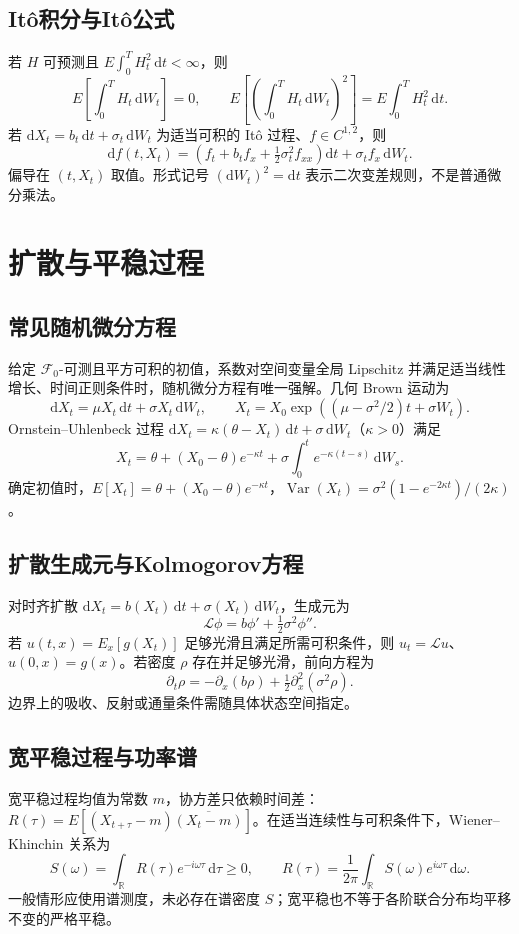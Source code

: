 \documentclass[../main.tex]{subfiles}
\begin{document}
\subsection{Itô积分与Itô公式}
若 $H$ 可预测且 $E\int_0^TH_t^2\,\mathrm dt<\infty$，则
\[
E\!\left[\int_0^TH_t\,\mathrm dW_t\right]=0,\qquad
E\!\left[\left(\int_0^TH_t\,\mathrm dW_t\right)^2\right]
=E\int_0^TH_t^2\,\mathrm dt.
\]
若 $\mathrm dX_t=b_t\,\mathrm dt+\sigma_t\,\mathrm dW_t$ 为适当可积的 Itô 过程、$f\in C^{1,2}$，则
\[
\mathrm df(t,X_t)=\left(f_t+b_tf_x+\tfrac12\sigma_t^2f_{xx}\right)\mathrm dt
+\sigma_tf_x\,\mathrm dW_t.
\]
偏导在 $(t,X_t)$ 取值。形式记号 $(\mathrm dW_t)^2=\mathrm dt$ 表示二次变差规则，不是普通微分乘法。
\section{扩散与平稳过程}
\subsection{常见随机微分方程}
给定 $\mathcal F_0$-可测且平方可积的初值，系数对空间变量全局 Lipschitz 并满足适当线性增长、时间正则条件时，随机微分方程有唯一强解。几何 Brown 运动为
\[
\mathrm dX_t=\mu X_t\,\mathrm dt+\sigma X_t\,\mathrm dW_t,
\qquad X_t=X_0\exp((\mu-\sigma^2/2)t+\sigma W_t).
\]
Ornstein--Uhlenbeck 过程 $\mathrm dX_t=\kappa(\theta-X_t)\,\mathrm dt+\sigma\,\mathrm dW_t$（$\kappa>0$）满足
\[
X_t=\theta+(X_0-\theta)e^{-\kappa t}
+\sigma\int_0^te^{-\kappa(t-s)}\,\mathrm dW_s.
\]
确定初值时，$E[X_t]=\theta+(X_0-\theta)e^{-\kappa t}$，$\operatorname{Var}(X_t)=\sigma^2(1-e^{-2\kappa t})/(2\kappa)$。
\subsection{扩散生成元与Kolmogorov方程}
对时齐扩散 $\mathrm dX_t=b(X_t)\,\mathrm dt+\sigma(X_t)\,\mathrm dW_t$，生成元为
\[
\mathcal L\phi=b\phi'+\tfrac12\sigma^2\phi''.
\]
若 $u(t,x)=E_x[g(X_t)]$ 足够光滑且满足所需可积条件，则 $u_t=\mathcal Lu$、$u(0,x)=g(x)$。若密度 $\rho$ 存在并足够光滑，前向方程为
\[
\partial_t\rho=-\partial_x(b\rho)+\tfrac12\partial_x^2(\sigma^2\rho).
\]
边界上的吸收、反射或通量条件需随具体状态空间指定。
\subsection{宽平稳过程与功率谱}
宽平稳过程均值为常数 $m$，协方差只依赖时间差：$R(\tau)=E[(X_{t+\tau}-m)\overline{(X_t-m)}]$。在适当连续性与可积条件下，Wiener--Khinchin 关系为
\[
S(\omega)=\int_{\mathbb R}R(\tau)e^{-i\omega\tau}\,\mathrm d\tau\ge0,
\qquad R(\tau)=\frac1{2\pi}\int_{\mathbb R}S(\omega)e^{i\omega\tau}\,\mathrm d\omega.
\]
一般情形应使用谱测度，未必存在谱密度 $S$；宽平稳也不等于各阶联合分布均平移不变的严格平稳。
\end{document}
